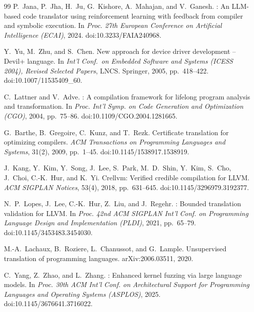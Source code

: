 \begin{thebibliography}{99}
P.~Jana, P.~Jha, H.~Ju, G.~Kishore, A.~Mahajan, and V.~Ganesh.
: An {LLM}-based code translator using reinforcement learning with feedback from compiler and symbolic execution.
\newblock In \emph{Proc. 27th European Conference on Artificial Intelligence (ECAI)}, 2024.
\newblock doi:10.3233/FAIA240968.

Y.~Yu, M.~Zhu, and S.~Chen.
\newblock New approach for device driver development -- {Devil+} language.
\newblock In \emph{Int'l Conf.\ on Embedded Software and Systems (ICESS 2004), Revised Selected Papers}, LNCS. Springer, 2005, pp.~418--422.
\newblock doi:10.1007/11535409\_60.

C.~Lattner and V.~Adve.
: A compilation framework for lifelong program analysis and transformation.
\newblock In \emph{Proc. Int'l Symp. on Code Generation and Optimization (CGO)}, 2004, pp.~75--86.
\newblock doi:10.1109/CGO.2004.1281665.

G.~Barthe, B.~Gregoire, C.~Kunz, and T.~Rezk.
\newblock Certificate translation for optimizing compilers.
\newblock \emph{ACM Transactions on Programming Languages and Systems}, 31(2), 2009, pp.~1--45.
\newblock doi:10.1145/1538917.1538919.

J.~Kang, Y.~Kim, Y.~Song, J.~Lee, S.~Park, M.~D.~Shin, Y.~Kim, S.~Cho, J.~Choi, C.-K.~Hur, and K.~Yi.
\newblock Crellvm: Verified credible compilation for {LLVM}.
\newblock \emph{ACM SIGPLAN Notices}, 53(4), 2018, pp.~631--645.
\newblock doi:10.1145/3296979.3192377.

N.~P.~Lopes, J.~Lee, C.-K.~Hur, Z.~Liu, and J.~Regehr.
: Bounded translation validation for {LLVM}.
\newblock In \emph{Proc. 42nd ACM SIGPLAN Int'l Conf. on Programming Language Design and Implementation (PLDI)}, 2021, pp.~65--79.
\newblock doi:10.1145/3453483.3454030.

M.-A.~Lachaux, B.~Roziere, L.~Chanussot, and G.~Lample.
\newblock Unsupervised translation of programming languages.
\newblock arXiv:2006.03511, 2020.

C.~Yang, Z.~Zhao, and L.~Zhang.
: Enhanced kernel fuzzing via large language models.
\newblock In \emph{Proc. 30th ACM Int'l Conf. on Architectural Support for Programming Languages and Operating Systems (ASPLOS)}, 2025.
\newblock doi:10.1145/3676641.3716022.


\end{thebibliography}
